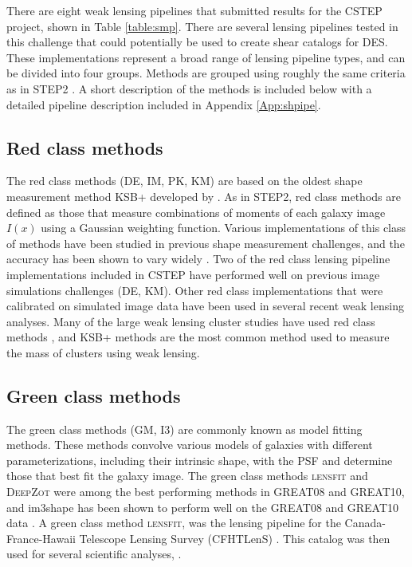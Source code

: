 There are eight weak lensing pipelines that submitted 
results for the CSTEP project, shown in Table \ref{table:smp}.
There are several lensing pipelines tested in this challenge that could potentially
be used to create shear catalogs for DES. These implementations
represent a broad range of lensing pipeline types, and can be divided
into four groups. Methods are grouped using roughly the same criteria 
as in STEP2 \citep{STEP2}. A short description of the methods is
included below with a detailed pipeline description included in
Appendix \ref{App:shpipe}.\\

\subsection{Red class methods}
The red class methods (DE, IM, PK, KM) are based on the oldest 
shape measurement method KSB+ developed by 
\citet{KSB}. As in STEP2, red class methods are
defined as those that measure combinations of
moments of each galaxy image $I(x)$ using a Gaussian 
weighting function. Various implementations
of this class of methods have been studied in previous shape
measurement challenges, and the accuracy has been shown 
to vary widely \citep{STEP2, GREAT10}.  Two of the red class lensing
pipeline implementations included in CSTEP have performed well on
previous image simulations challenges (DE, KM). Other 
red class implementations that were calibrated on
simulated image data have been used in several recent 
weak lensing analyses\citep[e.g.][]{Gruen_s, Apple, TS}. Many of the
large weak lensing cluster studies have used red class
methods \citep{HH}, and KSB+ methods are the most common
method used to measure the mass of clusters using weak lensing.
 
\subsection{Green class methods}
The green class methods (GM, I3) are commonly known as model fitting
methods. These methods convolve various models of galaxies with different 
parameterizations, including their intrinsic shape, with the PSF and
determine those that best fit the galaxy image. The green class methods
\textsc{lensfit} and \textsc{DeepZot} were among the best performing 
methods in GREAT08 and GREAT10, and im3shape has been shown 
to perform well on the GREAT08 and GREAT10 data \citep{Jzun}. 
A green class method \textsc{lensfit}, was 
the lensing pipeline for the Canada-France-Hawaii 
Telescope Lensing Survey (CFHTLenS) \citep{CHey}. This catalog 
was then used for several scientific analyses, \citep[e.g.][]{CH1,
  CH2, CH3}. 


